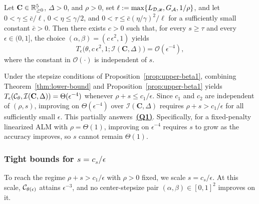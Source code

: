 \begin{proposition}
\label{prop:upper-beta1}
Let \(\mathbf C\in\mathbb{R}^5_{\ge0}\), \(\Delta>0\), and \(\rho>0\), set
\(\ell:=\max\{L_{\mathcal{D},\bm{x}},G_{\mathcal{A}},1/\rho\}\), and let
\(0<\gamma\le\bar c/\ell\), \(0<\eta\le\gamma/2\), and
\(0<\tau\le\bar c(\eta/\gamma)^2/\ell\) for a sufficiently small
constant \(\bar c>0\). Then there exists \(c>0\) such that, for
every \(s\ge\tau\) and every \(\epsilon\in(0,1]\), the choice
\((\alpha,\beta)=(c\,\epsilon^2,1)\) yields
\[
    T_\epsilon\bigl(\theta,c\,\epsilon^2,1;\mathcal I(\mathbf C,\Delta)\bigr)
    =\mathcal O(\epsilon^{-4}),
\]
where the constant in \(\mathcal O(\cdot)\) is independent of \(s\).
\end{proposition}
\noindent Under the stepsize conditions of
Proposition~\ref{prop:upper-beta1}, combining Theorem~\ref{thm:lower-bound}
and Proposition~\ref{prop:upper-beta1}
yields \(T_\epsilon(\mathcal{C}_\theta,\mathcal I(\mathbf C,\Delta))=\Theta(\epsilon^{-4})\)
whenever \(\rho+s\le c_1/\epsilon\). Since \(c_1\) and \(c_2\) are
independent of \((\rho,s)\), improving on \(\Theta(\epsilon^{-4})\) over
\(\mathcal I(\mathbf C,\Delta)\) requires \(\rho+s>c_1/\epsilon\) for 
all sufficiently small \(\epsilon\). This partially 
answers~\hyperlink{Q1}{\textbf{(Q1)}}. Specifically, for a fixed-penalty linearized ALM with
\(\rho=\Theta(1)\), improving on \(\epsilon^{-4}\) requires \(s\) to grow as the
accuracy improves, so \(s\) cannot remain \(\Theta(1)\).

\subsubsection{Tight bounds for \texorpdfstring{\(s=c_s/\epsilon\)}{s = cs/epsilon}}

To reach the regime \(\rho+s>c_1/\epsilon\) with \(\rho>0\) fixed, we
scale \(s=c_s/\epsilon\). At this scale, \(\mathcal{C}_{\theta(\epsilon)}\)
attains \(\epsilon^{-3}\), and no center-stepsize pair
\((\alpha,\beta)\in[0,1]^2\) improves on it.

